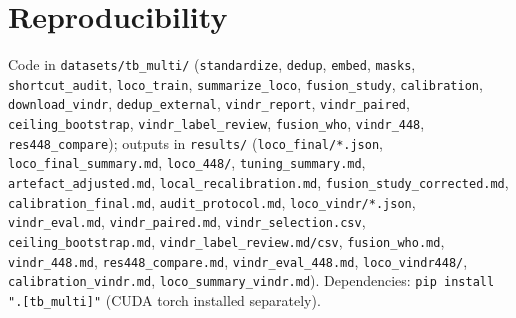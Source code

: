 \documentclass[10pt,a4paper]{article}
\begin{document}
\section*{Reproducibility}\sloppy
Code in \texttt{datasets/tb\_multi/} (\texttt{standardize}, \texttt{dedup}, \texttt{embed}, \texttt{masks}, \texttt{shortcut\_audit}, \texttt{loco\_train}, \texttt{summarize\_loco}, \texttt{fusion\_study}, \texttt{calibration}, \texttt{download\_vindr}, \texttt{dedup\_external}, \texttt{vindr\_report}, \texttt{vindr\_paired}, \texttt{ceiling\_bootstrap}, \texttt{vindr\_label\_review}, \texttt{fusion\_who}, \texttt{vindr\_448}, \texttt{res448\_compare}); outputs in \texttt{results/} (\texttt{loco\_final/*.json}, \texttt{loco\_final\_summary.md}, \texttt{loco\_448/}, \texttt{tuning\_summary.md}, \texttt{artefact\_adjusted.md}, \texttt{local\_recalibration.md}, \texttt{fusion\_study\_corrected.md}, \texttt{calibration\_final.md}, \texttt{audit\_protocol.md}, \texttt{loco\_vindr/*.json}, \texttt{vindr\_eval.md}, \texttt{vindr\_paired.md}, \texttt{vindr\_selection.csv}, \texttt{ceiling\_bootstrap.md}, \texttt{vindr\_label\_review.md/csv}, \texttt{fusion\_who.md}, \texttt{vindr\_448.md}, \texttt{res448\_compare.md}, \texttt{vindr\_eval\_448.md}, \texttt{loco\_vindr448/}, \texttt{calibration\_vindr.md}, \texttt{loco\_summary\_vindr.md}). Dependencies: \texttt{pip install ".[tb\_multi]"} (CUDA torch installed separately).
\end{document}
